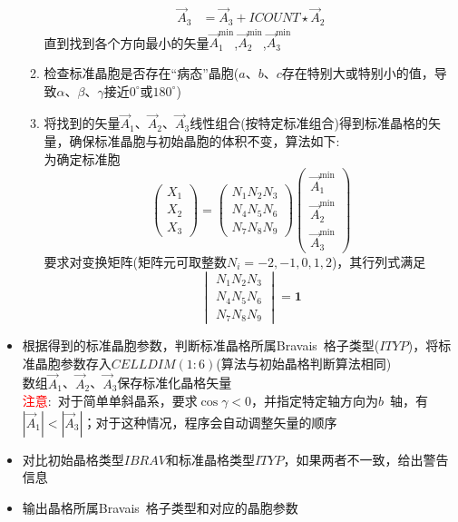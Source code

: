 \documentclass{article}      %
\begin{document}
\begin{itemize}
\begin{enumerate}
\begin{displaymath}
\begin{aligned}
						\vec A_3&=\vec A_3+\mathit{ICOUNT}\star\vec A_2
					\end{aligned}
				\end{displaymath}
				直到找到各个方向最小的矢量$\vec A_1^{\mathrm{min}}$,$\vec A_2^{\mathrm{min}}$,$\vec A_3^{\mathrm{min}}$
			\item 检查标准晶胞是否存在“病态”晶胞($a$、$b$、$c$存在特别大或特别小的值，导致$\alpha$、$\beta$、$\gamma$接近$0^{\circ}$或$180^{\circ}$)
			\item 将找到的矢量$\vec A_1$、$\vec A_2$、$\vec A_3$线性组合(按特定标准组合)得到标准晶格的矢量，确保标准晶胞与初始晶胞的体积不变，算法如下:\\
				为确定标准胞
				\begin{displaymath}
					\begin{pmatrix}
						X_1\\
						X_2\\
						X_3
					\end{pmatrix}=
\begin{pmatrix}
						N_1 N_2 N_3\\
						N_4 N_5 N_6\\
						N_7 N_8 N_9
\end{pmatrix}
\begin{pmatrix}
	\vec A_1^{\mathrm{min}} \\
	\vec A_2^{\mathrm{min}} \\
	\vec A_3^{\mathrm{min}}
\end{pmatrix}
				\end{displaymath}
				要求对变换矩阵(矩阵元可取整数$N_i=-2,-1,0,1,2$)，其行列式满足
				\begin{displaymath}
					\begin{vmatrix}
						N_1 N_2 N_3\\
						N_4 N_5 N_6\\
						N_7 N_8 N_9
					\end{vmatrix}=\mathbf{1}
				\end{displaymath}
		\end{enumerate}
			\item 根据得到的标准晶胞参数，判断标准晶格所属\textrm{Bravais~}格子类型($\mathit{ITYP}$)，将标准晶胞参数存入$\mathit{CELLDIM}(1:6)$(算法与初始晶格判断算法相同)\\
				数组$\vec A_1$、$\vec A_2$、$\vec A_3$保存标准化晶格矢量\\
				\textcolor{red}{注意}:~对于简单单斜晶系，要求$\cos\gamma<0$，并指定特定轴方向为$b$~轴，有$|\vec A_1|<|\vec A_3|$；对于这种情况，程序会自动调整矢量的顺序
			\item 对比初始晶格类型$\mathit{IBRAV}$和标准晶格类型$\mathit{ITYP}$，如果两者不一致，给出警告信息
			\item 输出晶格所属\textrm{Bravais~}格子类型和对应的晶胞参数
\end{itemize}
\end{document}
